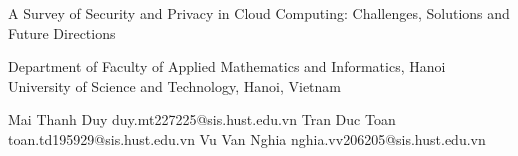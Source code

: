 A Survey of Security and Privacy in Cloud Computing: Challenges, Solutions and Future Directions

Department of Faculty of Applied Mathematics and Informatics, Hanoi University of Science and Technology, Hanoi, Vietnam

Mai Thanh Duy
duy.mt227225@sis.hust.edu.vn
Tran Duc Toan
toan.td195929@sis.hust.edu.vn
Vu Van Nghia
nghia.vv206205@sis.hust.edu.vn